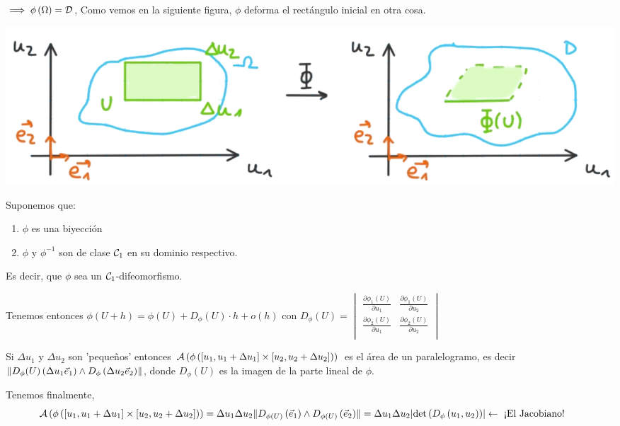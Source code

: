\documentclass{report}
\begin{document}
    \vspace{0.4cm}\noindent $\implies \phi\left(\Omega\right)=\mathcal{D}$, Como vemos en la siguiente figura, $\phi$ deforma el rectángulo inicial en otra cosa.
    
    \begin{center}
      \includegraphics[width=\textwidth]{cambioVar2.png}
    \end{center}

    \clearpage
    \noindent Suponemos que:
    \begin{enumerate}
      \item $\phi$ es una biyección
      \item $\phi$ y $\phi^{-1}$ son de clase $\mathcal{C}_1$ en su dominio respectivo.
    \end{enumerate}
    Es decir, que $\phi$ sea un $\mathcal{C}_1$-difeomorfismo. 
    
    \noindent Tenemos entonces $\phi\left(U+h\right)=\phi(U)+D_{\phi}(U)\cdot h +o(h)$
    \hspace{1cm}con $D_{\phi}(U)=
    \begin{vmatrix}
      \frac{\partial\phi_1(U)}{\partial u_1}& \frac{\partial\phi_1(U)}{\partial u_2} \\
      \frac{\partial\phi_2(U)}{\partial u_1}& \frac{\partial\phi_2(U)}{\partial u_2} \\
    \end{vmatrix}$ 

    \noindent Si $\Delta u_1$ y $\Delta u_2$ son 'pequeños' entonces $\mathcal{A}\left(\phi\left([u_1,u_1+\Delta u_1]\times[u_2,u_2+\Delta u_2]\right)\right)$ es el área 
    de un paralelogramo, es decir $\lVert D_{\phi}(U)\left(\Delta u_1\vec{e}_1\right)\wedge D_\phi\left(\Delta u_2\vec{e}_2\right)\rVert$, donde $D_\phi(U)$ es la imagen de la parte lineal de $\phi$.

    \vspace{0.2cm}\noindent Tenemos finalmente, 
    $$\hspace{-16pt}\mcA\left(\phi\left([u_1,u_1+\Delta u_1]\times[u_2,u_2+\Delta u_2]\right)\right)=\Delta u_1\Delta u_2\norm{D_{\phi(U)}\left(\vec{e}_1\right)\wedge D_{\phi(U)}\left(\vec{e}_2\right)}=
    \Delta u_1\Delta u_2\abs{\text{det}\left(D_\phi\left(u_1,u_2\right)\right)} \leftarrow\text{ ¡El Jacobiano!}$$
\end{document}
